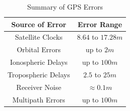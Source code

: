 \renewcommand{\arraystretch}{1.5}
\begin{table}
    \begin{center}
        \caption{Summary of GPS Errors}
        \label{tab:GPS Errors}
        \begin{tabular}{ c|c }
            \hline
            \textbf{Source of Error} & \textbf{Error Range} \\
            \hline
            Satellite Clocks & $8.64$ to $17.28m$\\
            Orbital Errors & up to $2m$\\
            Ionospheric Delays & up to $100m$\\
            Tropospheric Delays & $2.5$ to $25m$\\
            Receiver Noise & $\approx 0.1m$\\
            Multipath Errors & up to $100m$\\
            \hline
        \end{tabular}
    \end{center}
\end{table}
\renewcommand{\arraystretch}{1}




